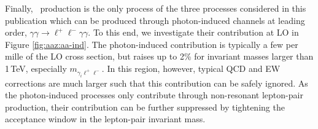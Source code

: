 Finally, \aaz\ production is the only process of the three processes 
considered in this publication which can be produced through 
photon-induced channels at leading order, 
$\gamma\gamma\to\ell^+\ell^-\gamma\gamma$. 
To this end, we investigate their contribution at LO in 
Figure \ref{fig:aaz:aa-ind}. 
The photon-induced contribution is typically a few per mille of the 
LO cross section, but raises up to 2\% for invariant masses larger 
than 1\,TeV, especially $m_{\gamma_i\ell^+\ell^-}$. 
In this region, however, typical QCD and EW corrections are much larger 
such that this contribution can be safely ignored. 
As the photon-induced processes only contribute through non-resonant 
lepton-pair production, their contribution can be further suppressed 
by tightening the acceptance window in the lepton-pair invariant mass.

